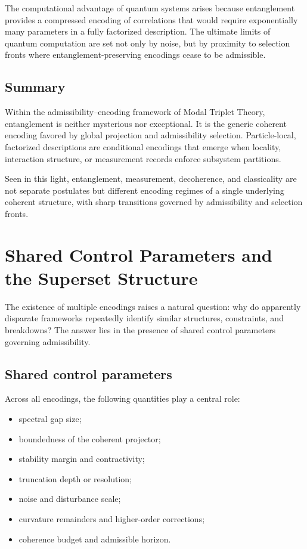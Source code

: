 \documentclass[11pt]{article}
\begin{document}
The computational advantage of quantum systems arises because entanglement provides a
compressed encoding of correlations that would require exponentially many parameters in a
fully factorized description. The ultimate limits of quantum computation are set not only by
noise, but by proximity to selection fronts where entanglement-preserving encodings cease to
be admissible.

\subsection{Summary}
\label{sec:ent_summary_encoding}

Within the admissibility–encoding framework of Modal Triplet Theory, entanglement is neither
mysterious nor exceptional. It is the generic coherent encoding favored by global projection
and admissibility selection. Particle-local, factorized descriptions are conditional encodings
that emerge when locality, interaction structure, or measurement records enforce subsystem
partitions.

Seen in this light, entanglement, measurement, decoherence, and classicality are not separate
postulates but different encoding regimes of a single underlying coherent structure, with
sharp transitions governed by admissibility and selection fronts.

\section{Shared Control Parameters and the Superset Structure}

The existence of multiple encodings raises a natural question: why do apparently disparate frameworks repeatedly identify similar structures, constraints, and breakdowns? The answer lies in the presence of shared control parameters governing admissibility.

\subsection{Shared control parameters}

Across all encodings, the following quantities play a central role:
\begin{itemize}
\item spectral gap size;
\item boundedness of the coherent projector;
\item stability margin and contractivity;
\item truncation depth or resolution;
\item noise and disturbance scale;
\item curvature remainders and higher-order corrections;
\item coherence budget and admissible horizon.
\end{itemize}
\end{document}
